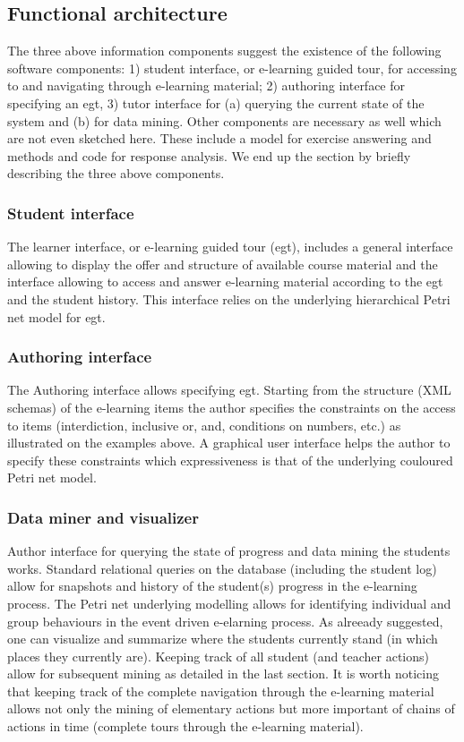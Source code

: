 \subsection{Functional architecture}

The three above information components suggest the existence of the
following software components: 1) student interface, or e-learning
guided tour, for accessing to and navigating through e-learning
material; 2) authoring interface for specifying an egt, 3) tutor
interface for (a) querying the current state of the system and (b) for
data mining. Other components are necessary as well which are not even
sketched here. These include a model for exercise answering and
methods and code for response analysis. We end up the section by
briefly describing the three above components.

\subsubsection*{Student interface}

The learner interface, or e-learning guided tour (egt), includes a
general interface allowing to display the offer and structure of
available course material and the interface allowing to access and
answer e-learning material according to the egt and the student
history. This interface relies on the underlying hierarchical Petri
net model for egt.


\subsubsection*{Authoring interface}

The Authoring interface allows specifying egt. Starting from the
structure (XML schemas) of the e-learning items the author specifies
the constraints on the access to items (interdiction, inclusive or,
and, conditions on numbers, etc.) as illustrated on the examples
above. A graphical user interface helps the author to specify these
constraints which expressiveness is that of the underlying couloured
Petri net model.

\subsubsection*{Data miner and visualizer}

Author interface for querying the state of progress and data mining
the students works.  Standard relational queries on the database
(including the student log) allow for snapshots and history of the
student(s) progress in the e-learning process. The Petri net
underlying modelling allows for identifying individual and group
behaviours in the event driven e-elarning process. As alreeady
suggested, one can visualize and summarize where the students
currently stand (in which places they currently are). Keeping track of
all student (and teacher actions) allow for subsequent mining as
detailed in the last section. It is worth noticing that keeping track of
the complete navigation through the e-learning material allows not
only the mining of elementary actions but more important of chains of
actions in time (complete tours through the e-learning
material).





